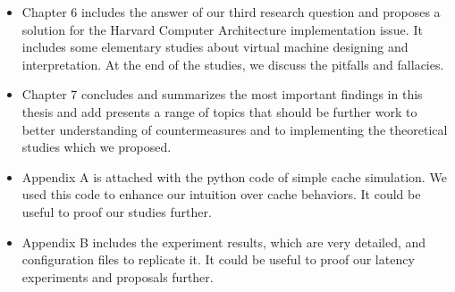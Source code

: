 \begin{itemize}
	\item Chapter 6 includes the answer of our third research question and proposes a solution for the Harvard Computer Architecture implementation issue. It includes some elementary studies about virtual machine designing and interpretation. At the end of the studies, we discuss the pitfalls and fallacies.
	\item Chapter 7 concludes and summarizes the most important findings in this thesis and add presents a range of topics that should be further work to better understanding of countermeasures and to implementing the theoretical studies which we proposed. 
	\item Appendix A is attached with the python code of simple cache simulation. We used this code to enhance our intuition over cache behaviors. It could be useful to proof our studies further.
	\item Appendix B includes the experiment results, which are very detailed, and configuration files to replicate it. It could be useful to proof our latency experiments and proposals further.
\end{itemize}
